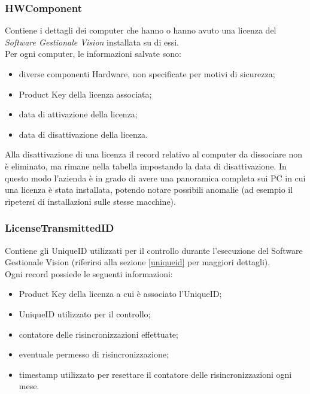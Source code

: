 \subsubsection{HWComponent}

Contiene i dettagli dei computer che hanno o hanno avuto una licenza del \textit{Software Gestionale Vision} installata su di essi. \\Per ogni computer, le informazioni salvate sono:

\begin{itemize}
\item diverse componenti Hardware, non specificate per motivi di sicurezza;
\item Product Key della licenza associata;
\item data di attivazione della licenza;
\item data di disattivazione della licenza.
\end{itemize}

Alla disattivazione di una licenza il record relativo al computer da dissociare non è eliminato, ma rimane nella tabella impostando la data di disattivazione. In questo modo l'azienda è in grado di avere una panoramica completa sui PC in cui una licenza è stata installata, potendo notare possibili anomalie (ad esempio il ripetersi di installazioni sulle stesse macchine). 

\subsubsection{LicenseTransmittedID}

Contiene gli UniqueID utilizzati per il controllo durante l’esecuzione del Software Gestionale Vision (riferirsi alla sezione \ref{uniqueid} per maggiori dettagli). \\Ogni record possiede le seguenti informazioni:

\begin{itemize}
\item Product Key della licenza a cui è associato l'UniqueID;
\item UniqueID utilizzato per il controllo;
\item contatore delle risincronizzazioni effettuate;
\item eventuale permesso di risincronizzazione;
\item timestamp utilizzato per resettare il contatore delle risincronizzazioni ogni mese.
\end{itemize}

